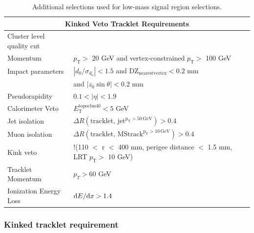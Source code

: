 \begin{table}
    \small
        \centering
    \begin{tabular}{ l | l}
                        \multicolumn{2}{c}{\textbf{Kinked Veto Tracklet Requirements}}\\
                        \hline
                        \hline
                        Cluster level quality cut& \\ 
                        Momentum &  $p_{\mathrm{T}} >$ 20 GeV and vertex-constrained $p_{\mathrm{T}} >$ 100 GeV  \\
                        Impact parameters & $|d_0/\sigma_{d_{0}}| < 1.5 $ and $\mathrm{DZ}_\mathrm{nearest vertex} < 0.2 $ mm \\ 
                                         & and $|z_0 \sin \theta| < 0.2 $ mm\\
                        Pseudorapidity & $0.1 < |\eta| < 1.9 $\\ 
                        Calorimeter Veto & $E_{\mathrm{T}}^{\mathrm{topoclus} 40 } < 5 $ GeV \\
                        Jet isolation& $\Delta R(\mathrm{tracklet,\, jet^{p_\mathrm{T} > 50  \, \mathrm{GeV}}}) > 0.4 $ \\
                        Muon isolation& $\Delta R(\mathrm{tracklet,\, MStrack^{p_\mathrm{T} > 10  \, \mathrm{GeV}}}) > 0.4 $ \\
                        Kink veto& !(110 $<$ r $<$ 400 mm, perigee distance $<$ 1.5 mm, LRT $p_{\mathrm{T}} >$ 10 GeV) \\
		                Tracklet Momentum & $p_T > 60$ GeV \\
		                Ionization Energy Loss & $\mathrm{d}E/\mathrm{d}x > 1.4$ \\ 
                        \hline
	\end{tabular}
    \caption{Additional selections used for low-mass signal region selections.}
    \label{tab:kinked_selections_tracklet}
\end{table}

\subsubsection{Kinked tracklet requirement}

